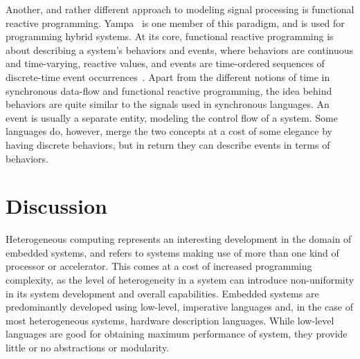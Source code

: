 \documentclass[../paper.tex]{subfiles}
\begin{document}
Another, and rather different approach to modeling signal processing is functional reactive programming. Yampa~\cite{yampa2003} is one member of this paradigm, and is used for programming hybrid systems. At its core, functional reactive programming is about describing a system's behaviors and events, where behaviors are continuous and time-varying, reactive values, and events are time-ordered sequences of discrete-time event occurrences~\cite{nilsson2002}. Apart from the different notions of time in synchronous data-flow and functional reactive programming, the idea behind behaviors are quite similar to the signals used in synchronous languages. An event is usually a separate entity, modeling the control flow of a system. Some languages do, however, merge the two concepts at a cost of some elegance by having discrete behaviors, but in return they can describe events in terms of behaviors.

\section{Discussion}
\label{disc}


Heterogeneous computing represents an interesting development in the domain of embedded systems, and refers to systems making use of more than one kind of processor or accelerator. This comes at a cost of increased programming complexity, as the level of heterogeneity in a system can introduce non-uniformity in its system development and overall capabilities. Embedded systems are predominantly developed using low-level, imperative languages and, in the case of most heterogeneous systems, hardware description languages. While low-level languages are good for obtaining maximum performance of system, they provide little or no abstractions or modularity. 

\end{document}
